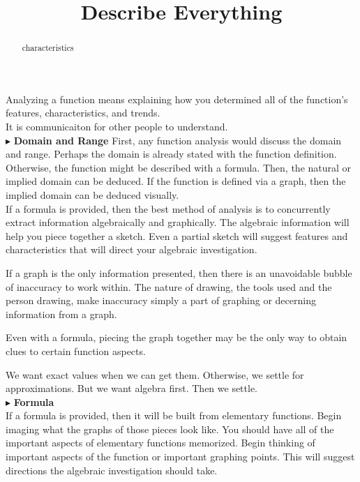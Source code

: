 \documentclass{ximera}
\title{Describe Everything}
\begin{document}
\begin{abstract}
characteristics
\end{abstract}
\maketitle




Analyzing a function means explaining how you determined all of the function's features, characteristics, and trends. \\
It is communicaiton for other people to understand. \\






$\blacktriangleright$ \textbf{\textcolor{red!10!blue!90!}{Domain and Range}}   
First, any function analysis would discuss the domain and range.  Perhaps the domain is already stated with the function definition. Otherwise, the function might be described with a formula. Then, the natural or implied domain can be deduced.  If the function is defined via a graph, then the implied domain can be deduced visually. \\

If a formula is provided, then the best method of analysis is to concurrently extract information algebraically and graphically.  The algebraic information will help you piece together a sketch.  Even a partial sketch will suggest features and characteristics that will direct your algebraic investigation.

If a graph is the only information presented, then there is an unavoidable bubble of inaccuracy to work within.  The nature of drawing, the tools used and the person drawing, make inaccuracy simply a part of graphing or decerning information from a graph.

Even with a formula, piecing the graph together may be the only way to obtain clues to certain function aspects. 

We want exact values when we can get them.  Otherwise, we settle for approximations. But we want algebra first.  Then we settle.\\





$\blacktriangleright$ \textbf{\textcolor{red!10!blue!90!}{Formula}}  \\
If a formula is provided, then it will be built from elementary functions.  Begin imaging what the graphs of those pieces look like. You should have all of the important aspects of elementary functions memorized. Begin thinking of important aspects of the function or important graphing points. This will suggest directions the algebraic investigation should take. \\
\end{document}
